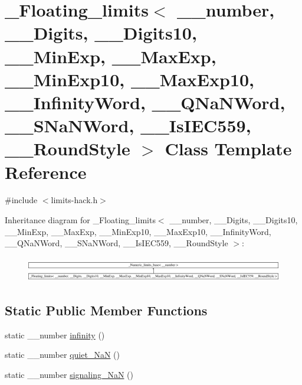 \hypertarget{class__Floating__limits}{}\section{\+\_\+\+Floating\+\_\+limits$<$ \+\_\+\+\_\+number, \+\_\+\+\_\+\+Digits, \+\_\+\+\_\+\+Digits10, \+\_\+\+\_\+\+Min\+Exp, \+\_\+\+\_\+\+Max\+Exp, \+\_\+\+\_\+\+Min\+Exp10, \+\_\+\+\_\+\+Max\+Exp10, \+\_\+\+\_\+\+Infinity\+Word, \+\_\+\+\_\+\+Q\+Na\+N\+Word, \+\_\+\+\_\+\+S\+Na\+N\+Word, \+\_\+\+\_\+\+Is\+I\+E\+C559, \+\_\+\+\_\+\+Round\+Style $>$ Class Template Reference}
\label{class__Floating__limits}


{\ttfamily \#include $<$limits-\/hack.\+h$>$}

Inheritance diagram for \+\_\+\+Floating\+\_\+limits$<$ \+\_\+\+\_\+number, \+\_\+\+\_\+\+Digits, \+\_\+\+\_\+\+Digits10, \+\_\+\+\_\+\+Min\+Exp, \+\_\+\+\_\+\+Max\+Exp, \+\_\+\+\_\+\+Min\+Exp10, \+\_\+\+\_\+\+Max\+Exp10, \+\_\+\+\_\+\+Infinity\+Word, \+\_\+\+\_\+\+Q\+Na\+N\+Word, \+\_\+\+\_\+\+S\+Na\+N\+Word, \+\_\+\+\_\+\+Is\+I\+E\+C559, \+\_\+\+\_\+\+Round\+Style $>$\+:\begin{figure}[H]
\begin{center}
\leavevmode
\includegraphics[height=1.091618cm]{class__Floating__limits}
\end{center}
\end{figure}
\subsection*{Static Public Member Functions}
\begin{DoxyCompactItemize}
\item 
static \+\_\+\+\_\+number \hyperlink{class__Floating__limits_a7c75774772f4a1b07c1d9eeaa7c3cf47}{infinity} ()
\item 
static \+\_\+\+\_\+number \hyperlink{class__Floating__limits_a6e6f2c6939ffc72a2af8cc62c0ce9ab5}{quiet\+\_\+\+Na\+N} ()
\item 
static \+\_\+\+\_\+number \hyperlink{class__Floating__limits_a4469ce80f6e578dbda6c887adc30afce}{signaling\+\_\+\+Na\+N} ()
\end{DoxyCompactItemize}
